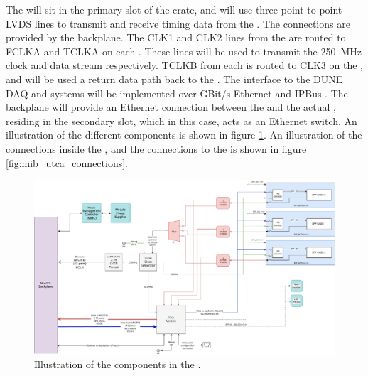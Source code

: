 \documentclass[main.tex]{subfiles}
\begin{document}
The  will sit in the primary  slot of the  crate, and will use three point-to-point LVDS lines to transmit and receive timing data from the . The connections are provided by the  backplane. The CLK1 and CLK2 lines from the  are routed to FCLKA and TCLKA on each . These lines will be used to transmit the \SI{250}{\MHz} clock and  data stream respectively. TCLKB from each  is routed to CLK3 on the , and will be used a return data path back to the . The interface to the DUNE DAQ and  systems will be implemented over GBit/s Ethernet and IPBus \cite{ipbus}. The  backplane will provide an Ethernet connection between the  and the actual , residing in the secondary  slot, which in this case, acts as an Ethernet switch. An illustration of the different  components is shown in figure \ref{fig:mib_layout}. An illustration of the connections inside the , and the connections to the  is shown in figure \ref{fig:mib_utca_connections}.

\begin{figure}[h]
\includegraphics[width=\textwidth]{dune_mib_v2.drawio.pdf}
\caption{Illustration of the components in the .}
\label{fig:mib_layout}
\end{figure}
\end{document}
